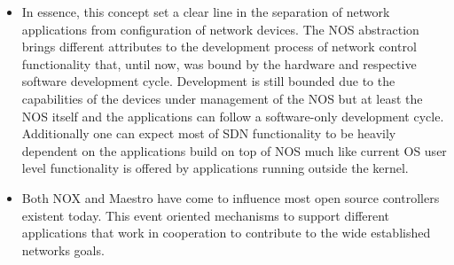 \begin{itemize}
\begin{itemize}
\item  In essence, this concept set a clear line in the separation of network applications from configuration of network devices. The NOS abstraction brings different attributes to the development process of network control functionality that, until now, was bound by the hardware and respective software development cycle. Development is still bounded due to the capabilities of the devices under management of the NOS but at least the NOS itself and the applications can follow a software-only
development cycle. Additionally one can expect most of SDN functionality to be heavily dependent   on the applications build on top of NOS much like current  OS user level functionality is offered by applications running outside the kernel.



\item Both NOX and Maestro have come to influence most open source controllers existent today. This event oriented mechanisms to support different applications that work in cooperation to contribute to the wide established networks goals. 

\end{itemize}








\end{itemize}
